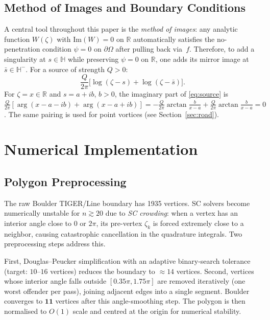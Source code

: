\documentclass[11pt]{article}
\newcommand{\HH}{\mathbb{H}}          %
\newcommand{\RR}{\mathbb{R}}
\newcommand{\Imag}{\mathrm{Im}}
\begin{document}
\subsection{Method of Images and Boundary Conditions}
\label{sec:images}

A central tool throughout this paper is the \emph{method of images}: any analytic
function $W(\zeta)$ with $\Imag(W)=0$ on $\RR$ automatically satisfies the
no-penetration condition $\psi=0$ on $\partial\Omega$ after pulling back via~$f$.
Therefore, to add a singularity at $s\in\HH$ while preserving $\psi=0$ on $\RR$,
one adds its mirror image at $\bar s\in\HH^-$. For a source of strength $Q>0$:
\begin{equation}
  \frac{Q}{2\pi}\bigl[\log(\zeta-s)+\log(\zeta-\bar{s})\bigr].
  \label{eq:source}
\end{equation}
For $\zeta=x\in\RR$ and $s=a+ib$, $b>0$, the imaginary part of
\eqref{eq:source} is $\frac{Q}{2\pi}[\arg(x-a-ib)+\arg(x-a+ib)]
=-\frac{Q}{2\pi}\arctan\!\frac{b}{x-a}+\frac{Q}{2\pi}\arctan\!\frac{b}{x-a}=0$.
The same pairing is used for point vortices (see Section~\ref{sec:road}).

\section{Numerical Implementation}
\label{sec:numerical}

\subsection{Polygon Preprocessing}

The raw Boulder TIGER/Line boundary has 1935 vertices. SC solvers become
numerically unstable for $n\gtrsim 20$ due to \emph{SC crowding}: when a vertex
has an interior angle close to $0$ or $2\pi$, its pre-vertex $\zeta_k$ is
forced extremely close to a neighbor, causing catastrophic cancellation in the
quadrature integrals. Two preprocessing steps address this.

First, Douglas--Peucker simplification with an adaptive binary-search tolerance
(target: $10$--$16$ vertices) reduces the boundary to $\approx14$ vertices.
Second, vertices whose interior angle falls outside $[0.35\pi, 1.75\pi]$ are
removed iteratively (one worst offender per pass), joining adjacent edges into
a single segment. Boulder converges to $\mathbf{11}$ vertices after this
angle-smoothing step. The polygon is then normalised to $O(1)$ scale and centred
at the origin for numerical stability.
\end{document}
